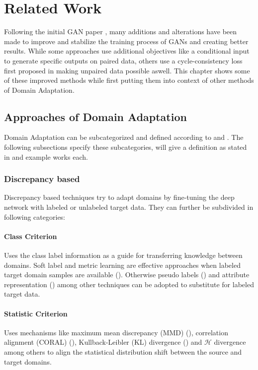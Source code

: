 \chapter{Related Work}
\label{sec:related_work}
Following the initial GAN paper \cite{NIPS2014_5423}, many additions and alterations have been made to improve and stabilize the training process of GANs and creating better results. While some approaches use additional objectives like a conditional input to generate specific outputs \cite{DBLP:journals/corr/IsolaZZE16} on paired data, others use a cycle-consistency loss first proposed in \cite{DBLP:journals/corr/ZhuPIE17} making unpaired data possible aswell. This chapter shows some of these improved methods while first putting them into context of other methods of Domain Adaptation. 

\section{Approaches of Domain Adaptation}
Domain Adaptation can be subcategorized and defined according to \cite{DBLP:journals/corr/Csurka17} and \cite{DBLP:journals/corr/abs-1802-03601}. The following subsections specify these subcategories, will give a definition as stated in \cite{DBLP:journals/corr/abs-1802-03601} and example works each.

\subsection{Discrepancy based}
Discrepancy based techniques try to adapt domains by fine-tuning the deep network with labeled or unlabeled target data. They can further be subdivided in following categories:

\subsubsection{Class Criterion}
Uses the class label information as a guide for transferring knowledge between domains. Soft label and metric learning are effective approaches when labeled target domain samples are available (). Otherwise pseudo labels () and attribute representation () among other techniques can be adopted to substitute for labeled target data. 

\subsubsection{Statistic Criterion}
Uses mechanisms like maximum mean discrepancy (MMD) (), correlation alignment (CORAL) (), Kullback-Leibler (KL) divergence () and $\mathcal{H}$ divergence among others to align the statistical distribution shift between the source and target domains. 

